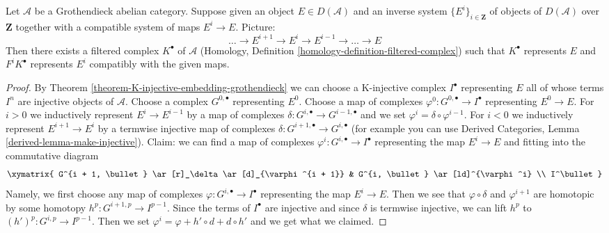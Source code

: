 \begin{lemma}
\label{lemma-represent-by-filtered-complex}
Let $\mathcal{A}$ be a Grothendieck abelian category. Suppose given an object
$E \in D(\mathcal{A})$ and an inverse system $\{E^i\}_{i \in \mathbf{Z}}$
of objects of $D(\mathcal{A})$ over $\mathbf{Z}$ together with
a compatible system of maps $E^i \to E$. Picture:
$$
\ldots \to E^{i + 1} \to E^i \to E^{i - 1} \to \ldots \to E
$$
Then there exists a filtered complex $K^\bullet$ of $\mathcal{A}$
(Homology, Definition \ref{homology-definition-filtered-complex})
such that $K^\bullet$ represents $E$
and $F^iK^\bullet$ represents $E^i$ compatibly with the given maps.
\end{lemma}

\begin{proof}
By Theorem \ref{theorem-K-injective-embedding-grothendieck}
we can choose a K-injective complex $I^\bullet$
representing $E$ all of whose terms $I^n$ are injective
objects of $\mathcal{A}$.
Choose a complex $G^{0, \bullet}$ representing $E^0$.
Choose a map of complexes $\varphi^0 : G^{0, \bullet} \to I^\bullet$
representing $E^0 \to E$.
For $i > 0$ we inductively represent $E^i \to E^{i - 1}$
by a map of complexes
$\delta : G^{i, \bullet} \to G^{i - 1, \bullet}$
and we set $\varphi^i = \delta \circ \varphi^{i - 1}$.
For $i < 0$ we inductively represent $E^{i + 1} \to E^i$
by a termwise injective map of complexes
$\delta : G^{i + 1, \bullet} \to G^{i, \bullet}$
(for example you can use
Derived Categories, Lemma \ref{derived-lemma-make-injective}).
Claim: we can find a map of complexes
$\varphi^i : G^{i, \bullet} \to I^\bullet$
representing the map $E^i \to E$ and
fitting into the commutative diagram
$$
\xymatrix{
G^{i + 1, \bullet} \ar[r]_\delta \ar[d]_{\varphi^{i + 1}} &
G^{i, \bullet} \ar[ld]^{\varphi^i} \\
I^\bullet
}
$$
Namely, we first choose any map of complexes
$\varphi : G^{i, \bullet} \to I^\bullet$
representing the map
$E^i \to E$. Then we see that $\varphi \circ \delta$
and $\varphi^{i + 1}$ are homotopic by some homotopy
$h^p : G^{i + 1, p} \to I^{p - 1}$.
Since the terms of
$I^\bullet$ are injective and since $\delta$
is termwise injective, we can lift $h^p$ to
$(h')^p : G^{i, p} \to I^{p - 1}$.
Then we set $\varphi^i = \varphi + h' \circ d + d \circ h'$
and we get what we claimed.


\end{proof}
